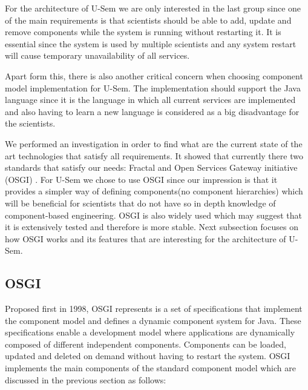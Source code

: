 For the architecture of U-Sem we are only interested in the last group since one of the main requirements is that scientists should be able to add, update and remove components while the system is running without restarting it. It is essential since the system is used by multiple scientists and any system restart will cause temporary unavailability of all services. 

Apart form this, there is also another critical concern when choosing component model implementation for U-Sem. The implementation should support the Java language since it is the language in which all current services are implemented and also having to learn a new language is considered as a big disadvantage for the scientists.

We performed an investigation in order to find what are the current state of the art technologies that satisfy all requirements. It showed that currently there two standards that satisfy our needs: Fractal \cite{Bruneton} and Open Services Gateway initiative (OSGI) \cite{OSGI}. For U-Sem we chose to use OSGI since our impression is that it provides a simpler way of defining components(no component hierarchies) which will be beneficial for scientists that do not have so in depth knowledge of component-based engineering. OSGI is also widely used\cite{Andre} which may suggest that it is extensively tested and therefore is more stable. Next subsection focuses on how OSGI works and its features that are interesting for the architecture of U-Sem.


\subsection{OSGI}

Proposed first in 1998, OSGI represents is a set of specifications that implement the component model and defines a dynamic component system for Java. These specifications enable a development model where applications are dynamically composed of different independent components. Components can be loaded, updated and deleted on demand without having to restart the system. OSGI implements the main components of the standard component model which are discussed in the previous section as follows:

